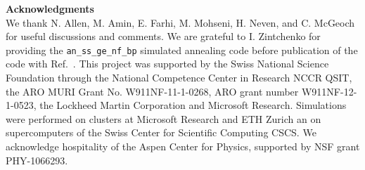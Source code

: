 {\small \noindent \textbf{Acknowledgments}\\
\noindent We thank N. Allen, M. Amin, E. Farhi, M. Mohseni, H. Neven, and C. McGeoch for useful discussions and comments. We are grateful to I. Zintchenko for providing  the  {\tt an\_ss\_ge\_nf\_bp} simulated annealing code before publication of the code with Ref.~\cite{sapaper}.
This project was supported by the Swiss National Science Foundation through the National Competence Center in Research NCCR QSIT, the ARO MURI Grant No. W911NF-11-1-0268, ARO grant number W911NF-12-1-0523, the Lockheed Martin Corporation and Microsoft Research. Simulations were performed on clusters at Microsoft Research and ETH Zurich an on supercomputers of the Swiss Center for Scientific Computing CSCS. We acknowledge hospitality of the Aspen Center for Physics, supported by NSF grant PHY-1066293.}
\\ \\

